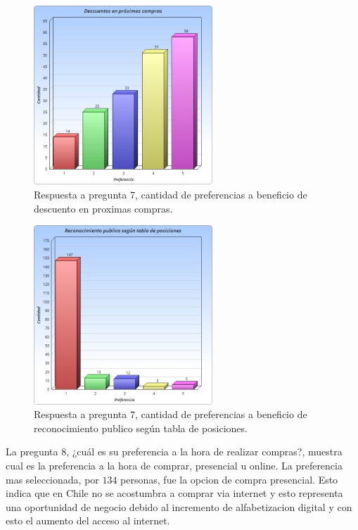 \begin{figure}[!htb]
  \centering
  \includegraphics[width=0.6\textwidth]{images/Graficos/graf_5_7.png}
  \caption[chart5.7]{Respuesta a pregunta $7$, cantidad de preferencias a beneficio de descuento en 
proximas compras.}
  \label{fig:chart5.7}
\end{figure}

\begin{figure}[!htb]
  \centering
  \includegraphics[width=0.6\textwidth]{images/Graficos/graf_5_8.png}
  \caption[chart5.8]{Respuesta a pregunta $7$, cantidad de preferencias a beneficio de reconocimiento 
publico según tabla de posiciones.}
  \label{fig:chart5.8}
\end{figure}


La pregunta $8$, ¿cuál es su preferencia a la hora de realizar compras?, muestra cual es la preferencia 
a la hora de comprar, presencial u online. La preferencia mas seleccionada, por $134$ personas, 
fue la opcion de compra presencial. Esto indica que en Chile no se acostumbra a comprar via internet 
y esto representa una oportunidad de negocio debido al incremento de alfabetizacion digital y 
con esto el aumento del acceso al internet.

